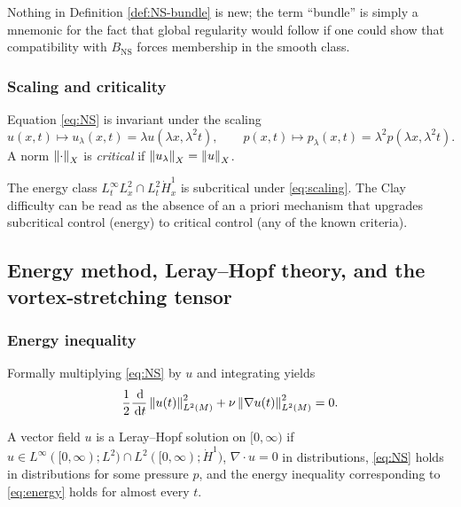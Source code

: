 Nothing in Definition \ref{def:NS-bundle} is new; the term ``bundle'' is simply a mnemonic for
the fact that global regularity would follow if one could show that compatibility with
$B_{\mathrm{NS}}$ forces membership in the smooth class.

\subsubsection{Scaling and criticality}
Equation \eqref{eq:NS} is invariant under the scaling
\begin{equation}\label{eq:scaling}
u(x,t)\mapsto u_\lambda(x,t)=\lambda u(\lambda x, \lambda^2 t),\qquad
p(x,t)\mapsto p_\lambda(x,t)=\lambda^2 p(\lambda x, \lambda^2 t).
\end{equation}
A norm $\left\lVert \cdot\right\rVert_X$ is \emph{critical} if $\left\lVert u_\lambda\right\rVert_X=\left\lVert u\right\rVert_X$.

\begin{remark}
The energy class $L^\infty_t L^2_x \cap L^2_t \dot H^1_x$ is subcritical under \eqref{eq:scaling}.
The Clay difficulty can be read as the absence of an a priori mechanism that upgrades
subcritical control (energy) to critical control (any of the known criteria).
\end{remark}

\subsection{Energy method, Leray--Hopf theory, and the vortex-stretching tensor}
\subsubsection{Energy inequality}
Formally multiplying \eqref{eq:NS} by $u$ and integrating yields
\begin{equation}\label{eq:energy}
\frac12 \frac{\,\mathrm{d}}{\,\mathrm{d} t}\left\lVert u(t)\right\rVert_{L^2(M)}^2 + \nu \left\lVert \nabla u(t)\right\rVert_{L^2(M)}^2 = 0.
\end{equation}

\begin{definition}\label{def:LerayHopf}
A vector field $u$ is a Leray--Hopf solution on $[0,\infty)$ if
$u\in L^\infty([0,\infty);L^2)\cap L^2([0,\infty);\dot H^1)$,
$\nabla\cdot u=0$ in distributions, \eqref{eq:NS} holds in distributions for some pressure $p$,
and the energy inequality corresponding to \eqref{eq:energy} holds for almost every $t$.
\end{definition}

